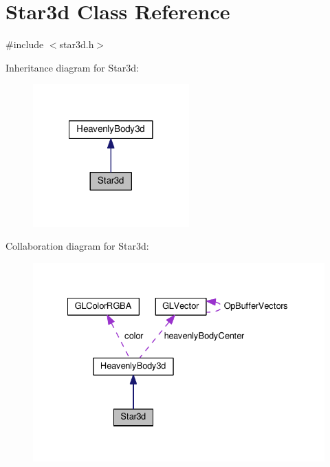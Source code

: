 \hypertarget{classStar3d}{
\section{\-Star3d \-Class \-Reference}
\label{d2/d14/classStar3d}
}


{\ttfamily \#include $<$star3d.\-h$>$}



\-Inheritance diagram for \-Star3d\-:
\nopagebreak
\begin{figure}[H]
\begin{center}
\leavevmode
\includegraphics[width=170pt]{d0/dd1/classStar3d__inherit__graph}
\end{center}
\end{figure}


\-Collaboration diagram for \-Star3d\-:
\nopagebreak
\begin{figure}[H]
\begin{center}
\leavevmode
\includegraphics[width=331pt]{da/dcf/classStar3d__coll__graph}
\end{center}
\end{figure}
